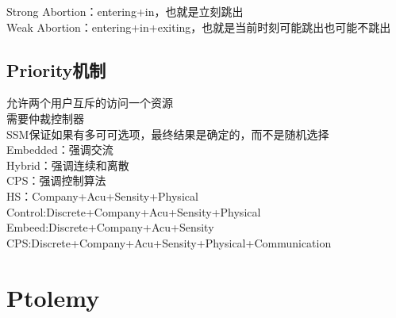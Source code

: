 \documentclass{article}
\begin{document}
\begin{CJK}{UTF8}{gbsn}
	Strong Abortion：entering+in，也就是立刻跳出\\
	Weak Abortion：entering+in+exiting，也就是当前时刻可能跳出也可能不跳出\\
	\subsection{Priority机制}
	允许两个用户互斥的访问一个资源\\
	需要仲裁控制器\\
	SSM保证如果有多可可选项，最终结果是确定的，而不是随机选择\\
	
	Embedded：强调交流\\
	Hybrid：强调连续和离散\\
	CPS：强调控制算法\\
	
	HS：Company+Acu+Sensity+Physical\\
	Control:Discrete+Company+Acu+Sensity+Physical\\
	Embeed:Discrete+Company+Acu+Sensity\\
	CPS:Discrete+Company+Acu+Sensity+Physical+Communication\\
	\section{Ptolemy}
	

\end{CJK}
\end{document}
